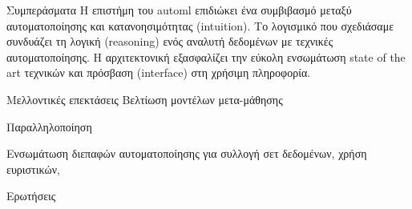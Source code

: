 \documentclass{beamer}
\begin{document}
  \begin{frame}{Συμπεράσματα} 
  	Η επιστήμη του automl επιδιώκει ένα συμβιβασμό μεταξύ αυτοματοποίησης και κατανοησιμότητας (intuition). Το λογισμικό που σχεδιάσαμε συνδυάζει τη λογική (reasoning) ενός αναλυτή δεδομένων με τεχνικές αυτοματοποίησης. Η αρχιτεκτονική εξασφαλίζει την εύκολη ενσωμάτωση state of the art τεχνικών και πρόσβαση (interface) στη χρήσιμη πληροφορία.
  \end{frame}
  \begin{frame}{Μελλοντικές επεκτάσεις} 
  	Βελτίωση μοντέλων μετα-μάθησης
  	
  	Παραλληλοποίηση 
  	
  	Ενσωμάτωση διεπαφών αυτοματοποίησης για συλλογή σετ δεδομένων, χρήση ευριστικών,  
  \end{frame}  
  \begin{frame}[standout]{} 
    \begin{center}
    Ερωτήσεις
    \end{center}
  \end{frame}
  \begin{frame}[allowframebreaks]{}
\nocite{*}
\printbibliography[title=Bιβλιογραφία(να μπει??)  ]
  \end{frame} 
\end{document}
